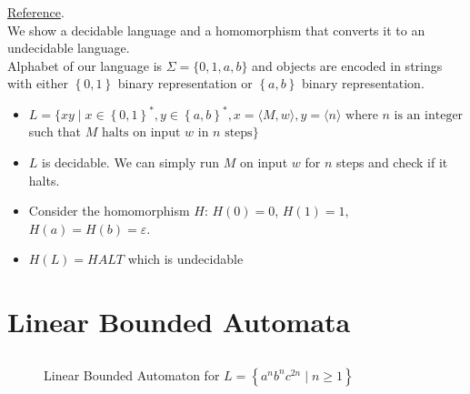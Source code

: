 \documentclass{article}
\begin{document}
\subsubsection{}
\href{https://courses.engr.illinois.edu/cs373/sp2013/Lectures/lec26.pdf}{Reference}.\\
We show a decidable language and a homomorphism that converts it to an undecidable language.\\
Alphabet of our language is \(\Sigma = \{0, 1, a, b\}\) and objects are encoded in strings with either \(\left\{0 ,1\right\}\) binary representation or \(\left\{a, b\right\}\) binary representation.
\begin{itemize}
\item \(L = \big\{xy\mid x\in \left\{0,1\right\}^*, y\in \left\{a,b\right\}^*, x=\langle M, w\rangle, y=\langle n\rangle \text{ where } n \text{ is an integer}\)\\
\tab\tab\tab\tab\tab such that \(M \text{ halts on input } w \text{ in } n \text{ steps} \big\}\)
\item \(L\) is decidable. We can simply run \(M\) on input \(w\) for \(n\) steps and check if it halts.
\item Consider the homomorphism \(H\): \(H(0)=0\), \(H(1)=1\), \(H(a)=H(b)=\varepsilon\).
\item \(H(L)=HALT\) which is undecidable 
\end{itemize}

\section{Linear Bounded Automata}
\subsection{}
\begin{figure}[H]
\centering

\caption{Linear Bounded Automaton for \(L=\left\{a^nb^nc^{2n}\mid n\ge 1\right\}\)}
\end{figure}
\end{document}
